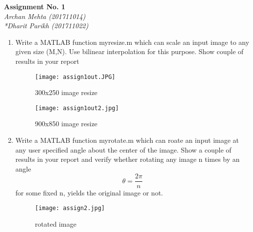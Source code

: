 \documentclass[12pt]{report}
\begin{document}
\begin{titlepage}
   \begin{center}
      \Large\textbf{Assignment No. 1}\\
      \large\textit{Archan Mehta (201711014)}
      \large\textit{\\*Dharit Parikh (201711022)}
   \end{center}
\end{titlepage}

\begin{center}
\begin{enumerate}

\item Write a MATLAB function myresize.m which can scale an input image to any given size (M,N). Use bilinear interpolation for this purpose. Show couple of results in your report

\begin{figure}[h]
\texttt{[image: assign1out.JPG]}
\caption{300x250 image resize}
\end{figure}

\begin{figure}[h]
\texttt{[image: assign1out2.jpg]}
\caption{900x850 image resize}
\end{figure}

\pagebreak

\item Write a MATLAB function myrotate.m which can roate an input image at any user specified angle about the center of the image. Show a couple of results in your report and verify whether rotating any image n times by an angle \[\theta = \frac{2\pi}{n}\]
for some fixed n, yields the original image or not.

\begin{figure}[h]
\texttt{[image: assign2.jpg]}
\caption{rotated image}
\end{figure}


\end{enumerate}
\end{center}
\end{document}
